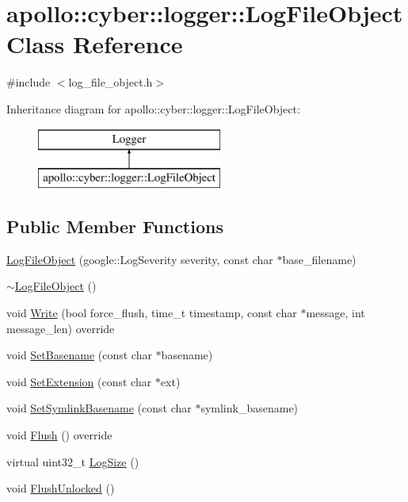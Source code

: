 \hypertarget{classapollo_1_1cyber_1_1logger_1_1LogFileObject}{\section{apollo\-:\-:cyber\-:\-:logger\-:\-:Log\-File\-Object Class Reference}
\label{classapollo_1_1cyber_1_1logger_1_1LogFileObject}
}


{\ttfamily \#include $<$log\-\_\-file\-\_\-object.\-h$>$}

Inheritance diagram for apollo\-:\-:cyber\-:\-:logger\-:\-:Log\-File\-Object\-:\begin{figure}[H]
\begin{center}
\leavevmode
\includegraphics[height=2.000000cm]{classapollo_1_1cyber_1_1logger_1_1LogFileObject}
\end{center}
\end{figure}
\subsection*{Public Member Functions}
\begin{DoxyCompactItemize}
\item 
\hyperlink{classapollo_1_1cyber_1_1logger_1_1LogFileObject_a833a101b1328a34ff04b98c85f191721}{Log\-File\-Object} (google\-::\-Log\-Severity severity, const char $\ast$base\-\_\-filename)
\item 
\hyperlink{classapollo_1_1cyber_1_1logger_1_1LogFileObject_a03a476423210920b568648da3f80d3f2}{$\sim$\-Log\-File\-Object} ()
\item 
void \hyperlink{classapollo_1_1cyber_1_1logger_1_1LogFileObject_a9ba7a234cc8702170c305e0de970b012}{Write} (bool force\-\_\-flush, time\-\_\-t timestamp, const char $\ast$message, int message\-\_\-len) override
\item 
void \hyperlink{classapollo_1_1cyber_1_1logger_1_1LogFileObject_a7757684686f25c4ad6b552eb8d2d7457}{Set\-Basename} (const char $\ast$basename)
\item 
void \hyperlink{classapollo_1_1cyber_1_1logger_1_1LogFileObject_a5d4e55c263bd8e49b4882360cec74f78}{Set\-Extension} (const char $\ast$ext)
\item 
void \hyperlink{classapollo_1_1cyber_1_1logger_1_1LogFileObject_ae04342c963cd10bdc5bb2bbec192144f}{Set\-Symlink\-Basename} (const char $\ast$symlink\-\_\-basename)
\item 
void \hyperlink{classapollo_1_1cyber_1_1logger_1_1LogFileObject_ab398b6843a9302ef00b2817687d61f27}{Flush} () override
\item 
virtual uint32\-\_\-t \hyperlink{classapollo_1_1cyber_1_1logger_1_1LogFileObject_a380638b75320fe715433f87d522c543d}{Log\-Size} ()
\item 
void \hyperlink{classapollo_1_1cyber_1_1logger_1_1LogFileObject_a50388bac680858687619b981a42dc502}{Flush\-Unlocked} ()
\end{DoxyCompactItemize}
